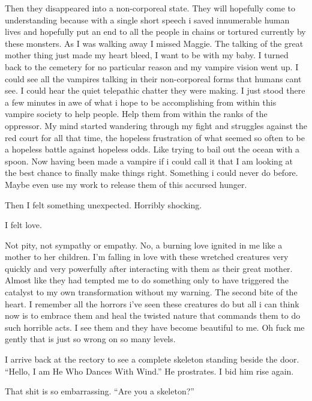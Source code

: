 Then they disappeared into a non-corporeal state. They will hopefully come to understanding because with a single short speech i saved innumerable human lives and hopefully put an end to all the people in chains or tortured currently by these monsters. As I was walking away I missed Maggie. The talking of the great mother thing just made my heart bleed, I want to be with my baby. I turned back to the cemetery for no particular reason and my vampire vision went up. I could see all the vampires talking in their non-corporeal forms that humans cant see. I could hear the quiet telepathic chatter they were making. I just stood there a few minutes in awe of what i hope to be accomplishing from within this vampire society to help people. Help them from within the ranks of the oppressor. My mind started wandering through my fight and struggles against the red court for all that time, the hopeless frustration of what seemed so often to be a hopeless battle against hopeless odds. Like trying to bail out the ocean with a spoon. Now having been made a vampire if i could call it that I am looking at the best chance to finally make things right. Something i could never do before. Maybe even use my work to release them of this accursed hunger.\\
\bigskip

Then I felt something unexpected. Horribly shocking.\\
\bigskip

I felt love.\\
\bigskip

Not pity, not sympathy or empathy. No, a burning love ignited in me like a mother to her children. I'm falling in love with these wretched creatures very quickly and very powerfully after interacting with them as their great mother. Almost like they had tempted me to do something only to have triggered the catalyst to my own transformation without my warning. The second bite of the heart. I remember all the horrors i've seen these creatures do but all i can think now is to embrace them and heal the twisted nature that commands them to do such horrible acts. I see them and they have become beautiful to me. Oh fuck me gently that is just so wrong on so many levels.

I arrive back at the rectory to see a complete skeleton standing beside the door. ``Hello, I am He Who Dances With Wind.'' He prostrates. I bid him rise again. 

That shit is so embarrassing. ``Are you a skeleton?''

